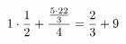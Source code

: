 \documentclass[preview]{standalone}
\begin{document}
\begin{align*}
\special{dvisvgm:raw <g id='unique000'>}1 \cdot \frac{1}{2} + \frac{\frac{5 \cdot 22}{3}}{4} = \frac{2}{3} + 9\special{dvisvgm:raw </g>}
\end{align*}
\end{document}
